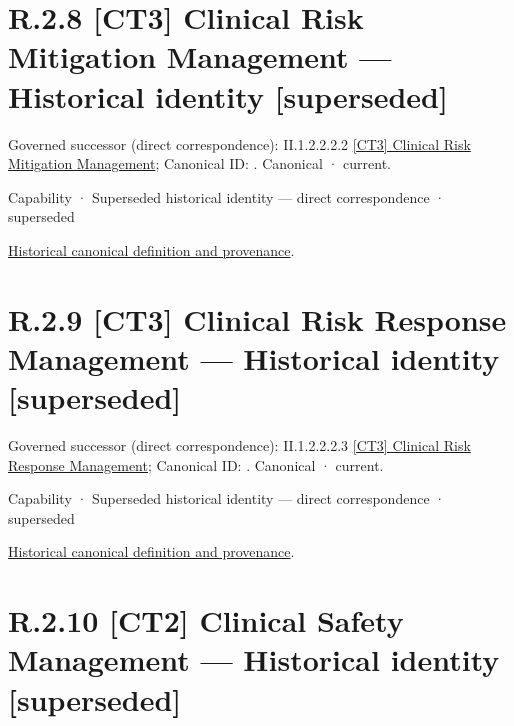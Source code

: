\section*{R.2.8 [CT3] Clinical Risk Mitigation Management — Historical identity [superseded]}
\label{navigation:R.2.8}

{\small Governed successor (direct correspondence): II.1.2.2.2.2 \hyperref[element:2c232ade21ec45619c3ee4e928bd97ee]{[CT3] Clinical Risk Mitigation Management}; Canonical ID: \texttt{}. Canonical · current.}\par
\label{element:0bd3311d89af45bb935fde20e719369c}
{\small Capability · Superseded historical identity — direct correspondence · superseded}\par
\href{../../../../continuum/strategy/capability/0bd3311d89af45bb935fde20e719369c.md}{Historical canonical definition and provenance}.\par
\section*{R.2.9 [CT3] Clinical Risk Response Management — Historical identity [superseded]}
\label{navigation:R.2.9}

{\small Governed successor (direct correspondence): II.1.2.2.2.3 \hyperref[element:5e36cb137e4e4782b2ddbf78cdf0da7b]{[CT3] Clinical Risk Response Management}; Canonical ID: \texttt{}. Canonical · current.}\par
\label{element:20f719ab4b6741b393ef570b4d1b05df}
{\small Capability · Superseded historical identity — direct correspondence · superseded}\par
\href{../../../../continuum/strategy/capability/20f719ab4b6741b393ef570b4d1b05df.md}{Historical canonical definition and provenance}.\par
\section*{R.2.10 [CT2] Clinical Safety Management — Historical identity [superseded]}
\label{navigation:R.2.10}

